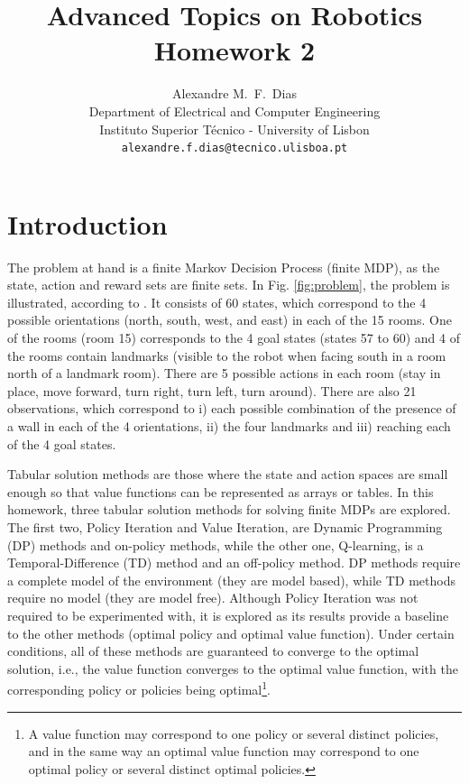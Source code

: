 \documentclass[a4paper]{article}
\title{Advanced Topics on Robotics \\ Homework 2}
\author{%
  Alexandre M.~F.~Dias\\%
  Department of Electrical and Computer Engineering\\
  Instituto Superior Técnico - University of Lisbon\\
  \texttt{alexandre.f.dias@tecnico.ulisboa.pt} \\
}
\begin{document}

\maketitle


\section{Introduction}


The problem at hand is a finite Markov Decision Process (finite MDP), as the state, action and reward sets are finite sets. In Fig. \ref{fig:problem}, the problem is illustrated, according to \cite{LITTMAN1995362}. It consists of 60 states, which correspond to the 4 possible orientations (north, south, west, and east) in each of the 15 rooms. One of the rooms (room 15) corresponds to the 4 goal states (states 57 to 60) and 4 of the rooms contain landmarks (visible to the robot when facing south in a room north of a landmark room). There are 5 possible actions in each room (stay in place, move forward, turn right, turn left, turn around). There are also 21 observations, which correspond to i) each possible combination of the presence of a wall in each of the 4 orientations, ii) the four landmarks and iii) reaching each of the 4 goal states.

Tabular solution methods are those where the state and action spaces are small enough so that value functions can be represented as arrays or tables. In this homework, three tabular solution methods for solving finite MDPs are explored. The first two, Policy Iteration and Value Iteration, are Dynamic Programming (DP) methods and on-policy methods, while the other one, Q-learning, is a Temporal-Difference (TD) method and an off-policy method. DP methods require a complete model of the environment (they are model based), while TD methods require no model (they are model free). Although Policy Iteration was not required to be experimented with, it is explored as its results provide a baseline to the other methods (optimal policy and optimal value function). Under certain conditions, all of these methods are guaranteed to converge to the optimal solution, i.e., the value function converges to the optimal value function, with the corresponding policy or policies being optimal\footnote{A value function may correspond to one policy or several distinct policies, and in the same way an optimal value function may correspond to one optimal policy or several distinct optimal policies.}.
\end{document}
